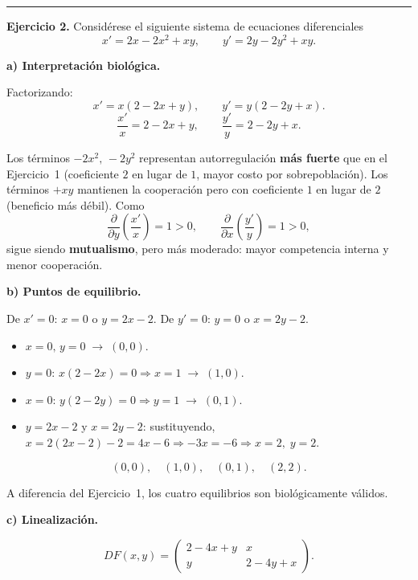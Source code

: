 \documentclass[12pt,letterpaper]{article}
\begin{document}
\bigskip
\noindent\rule{\textwidth}{0.3pt}
\bigskip

\noindent\textbf{Ejercicio 2.} Considérese el siguiente sistema de ecuaciones diferenciales
\[
  x' = 2x - 2x^2 + xy, \qquad y' = 2y - 2y^2 + xy.
\]

\noindent\textbf{a) Interpretación biológica.}

Factorizando:
\[
  x' = x(2-2x+y), \qquad y' = y(2-2y+x).
\]
\[
  \frac{x'}{x} = 2 - 2x + y, \qquad \frac{y'}{y} = 2 - 2y + x.
\]

Los términos $-2x^2,\,-2y^2$ representan autorregulación \textbf{más fuerte} que en el Ejercicio~1
(coeficiente $2$ en lugar de $1$, mayor costo por sobrepoblación). Los términos $+xy$ mantienen
la cooperación pero con coeficiente $1$ en lugar de $2$ (beneficio más débil). Como
\[
  \frac{\partial}{\partial y}\!\left(\frac{x'}{x}\right)=1>0,
  \qquad
  \frac{\partial}{\partial x}\!\left(\frac{y'}{y}\right)=1>0,
\]
sigue siendo \textbf{mutualismo}, pero más moderado: mayor competencia interna y menor cooperación.

\bigskip
\noindent\textbf{b) Puntos de equilibrio.}

De $x'=0$: $x=0$ o $y=2x-2$.
De $y'=0$: $y=0$ o $x=2y-2$.

\begin{itemize}
  \item $x=0,\,y=0 \;\to\; (0,0)$.
  \item $y=0$: $x(2-2x)=0 \Rightarrow x=1 \;\to\; (1,0)$.
  \item $x=0$: $y(2-2y)=0 \Rightarrow y=1 \;\to\; (0,1)$.
  \item $y=2x-2$ y $x=2y-2$: sustituyendo, $x = 2(2x-2)-2 = 4x-6 \Rightarrow -3x=-6
    \Rightarrow x=2,\; y=2$.
\end{itemize}

\[
  \boxed{(0,0),\quad (1,0),\quad (0,1),\quad (2,2).}
\]

A diferencia del Ejercicio~1, los cuatro equilibrios son biológicamente válidos.

\bigskip
\noindent\textbf{c) Linealización.}

\[
  DF(x,y) = \begin{pmatrix} 2-4x+y & x \\ y & 2-4y+x \end{pmatrix}.
\]
\end{document}
